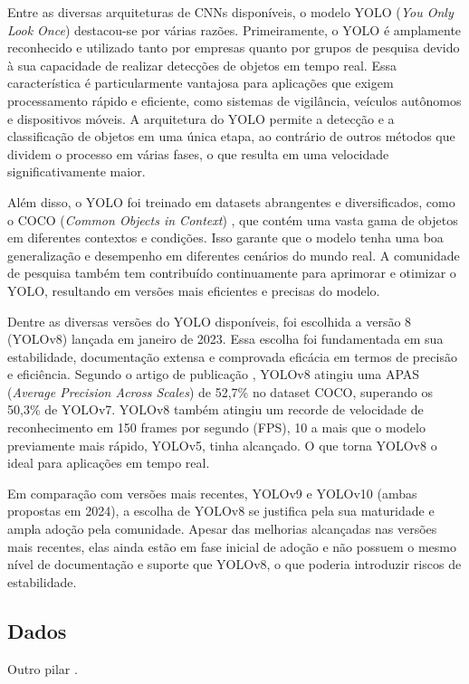 \documentclass[journal]{IEEEtran}
\begin{document}
Entre as diversas arquiteturas de CNNs disponíveis, o modelo YOLO (\textit{You Only Look Once}) \cite{redmon2016you} destacou-se por várias razões. Primeiramente, o YOLO é amplamente reconhecido e utilizado tanto por empresas quanto por grupos de pesquisa devido à sua capacidade de realizar detecções de objetos em tempo real. Essa característica é particularmente vantajosa para aplicações que exigem processamento rápido e eficiente, como sistemas de vigilância, veículos autônomos e dispositivos móveis. A arquitetura do YOLO permite a detecção e a classificação de objetos em uma única etapa, ao contrário de outros métodos que dividem o processo em várias fases, o que resulta em uma velocidade significativamente maior.

Além disso, o YOLO foi treinado em datasets abrangentes e diversificados, como o COCO (\textit{Common Objects in Context}) \cite{lin2014microsoft}, que contém uma vasta gama de objetos em diferentes contextos e condições. Isso garante que o modelo tenha uma boa generalização e desempenho em diferentes cenários do mundo real. A comunidade de pesquisa também tem contribuído continuamente para aprimorar e otimizar o YOLO, resultando em versões mais eficientes e precisas do modelo.

Dentre as diversas versões do YOLO disponíveis, foi escolhida a versão 8 (YOLOv8) lançada em janeiro de 2023. Essa escolha foi fundamentada em sua estabilidade, documentação extensa e comprovada eficácia em termos de precisão e eficiência. Segundo o artigo de publicação \cite{varghese2024yolov8}, YOLOv8 atingiu uma APAS (\textit{Average Precision Across Scales}) de 52,7\% no dataset COCO, superando os 50,3\% de YOLOv7. YOLOv8 também atingiu um recorde de velocidade de reconhecimento em 150 frames por segundo (FPS), 10 a mais que o modelo previamente mais rápido, YOLOv5, tinha alcançado. O que torna YOLOv8 o ideal para aplicações em tempo real.

Em comparação com versões mais recentes, YOLOv9 e YOLOv10 (ambas propostas em 2024), a escolha de YOLOv8 se justifica pela sua maturidade e ampla adoção pela comunidade. Apesar das melhorias alcançadas nas versões mais recentes, elas ainda estão em fase inicial de adoção e não possuem o mesmo nível de documentação e suporte que YOLOv8, o que poderia introduzir riscos de estabilidade.

\subsection{Dados}
\label{sec:data}
Outro pilar \lipsum[1].
\end{document}
